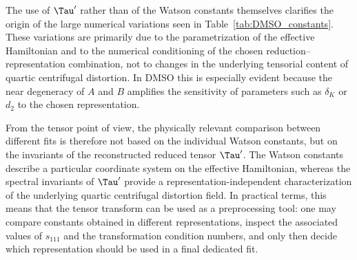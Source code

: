 The use of $\Tau'$ rather than of the Watson constants themselves
clarifies the origin of the large numerical variations seen in
Table~\ref{tab:DMSO_constants}.  These variations are primarily due to
the parametrization of the effective Hamiltonian and to the numerical
conditioning of the chosen reduction--representation combination, not
to changes in the underlying tensorial content of quartic centrifugal
distortion.  In DMSO this is especially evident because the near
degeneracy of $A$ and $B$ amplifies the sensitivity of parameters such
as $\delta_K$ or $d_2$ to the chosen representation.

From the tensor point of view, the physically relevant comparison
between different fits is therefore not based on the individual Watson
constants, but on the invariants of the reconstructed reduced tensor
$\Tau'$.  The Watson constants describe a particular coordinate system
on the effective Hamiltonian, whereas the spectral invariants of
$\Tau'$ provide a representation-independent characterization of the
underlying quartic centrifugal distortion field.  In practical terms,
this means that the tensor transform can be used as a preprocessing
tool: one may compare constants obtained in different representations,
inspect the associated values of $s_{111}$ and the transformation
condition numbers, and only then decide which representation should be
used in a final dedicated fit.
